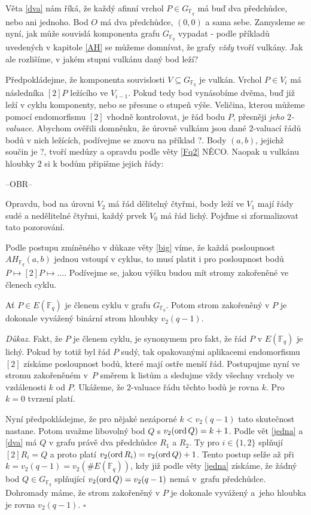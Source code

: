 \documentclass[12pt]{report}
\begin{document}
Věta \ref{dva} nám říká, že každý afinní vrchol $P \in G_{\mathbb{F}_q}$ má buď dva předchůdce, nebo ani jednoho. Bod $O$ má dva předchůdce, $(0,0)$ a sama sebe. Zamysleme se nyní, jak může souvislá komponenta grafu $G_{\mathbb{F}_q}$ vypadat - podle příkladů uvedených v kapitole \ref{AH} se můžeme domnívat, že grafy \textit{vždy} tvoří vulkány. Jak ale rozlišíme, v jakém stupni vulkánu daný bod leží?

Předpokládejme, že komponenta souvislosti $V \subseteq G_{\mathbb{F}_q}$ je vulkán.  Vrchol $P \in V_i$ má následníka $[2]P$ ležícího ve $V_{i-1}$. Pokud tedy bod vynásobíme dvěma, buď již leží v cyklu komponenty, nebo se přesune o stupeň výše. Veličina, kterou můžeme pomocí endomorfismu $[2]$ vhodně kontrolovat, je řád bodu $P$, přesněji \textit{jeho $2$-valuace}. Abychom ověřili domněnku, že úrovně vulkánu jsou dané $2$-valuací řádů bodů v nich ležících, podívejme se znovu na příklad ?. Body $(a,b)$, jejichž součin je ?, tvoří medúzy a opravdu podle věty \ref{Fq2} NĚCO. Naopak u vulkánu hloubky $2$ si k bodům připišme jejich řády:

--OBR--

Opravdu, bod na úrovni $V_2$ má řád dělitelný čtyřmi, body leží ve $V_1$ mají řády sudé a nedělitelné čtyřmi, každý prvek $V_0$ má řád lichý. Pojďme si zformalizovat tato pozorování.

Podle postupu zmíněného v důkaze věty \ref{big} víme, že každá posloupnost $AH_{\mathbb{F}_q}(a,b)$ jednou vstoupí v cyklus, to  musí platit i pro posloupnost bodů $P \longmapsto [2] P \longmapsto \dots$. Podívejme se, jakou výšku budou mít stromy zakořeněné ve členech cyklu.   

\begin{veta}
Ať $P \in E(\mathbb{F}_q)$ je členem cyklu v grafu $G_{\mathbb{F}_q}$. Potom strom zakořeněný v $P$ je dokonale vyvážený binární strom hloubky $v_2 (q-1)$. 
\end{veta}

\noindent \textit{Důkaz.} Fakt, že $P$ je členem cyklu, je synonymem pro fakt, že řád $P$ v $E(\mathbb{F}_q)$ je lichý. Pokud by totiž byl řád $P$ sudý, tak opakovanými aplikacemi endomorfismu $[2]$ získáme posloupnost bodů, které mají ostře menší řád. Postupujme nyní ve stromu zakořeněném v~$P$ směrem k listům a sledujme vždy všechny vrcholy ve vzdálenosti $k$ od $P$. Ukážeme, že $2$-valuace řádu těchto bodů je rovna $k$. Pro $k=0$ tvrzení platí.

Nyní předpokládejme, že pro nějaké nezáporné $k < v_2 (q-1)$ tato skutečnost nastane. Potom uvažme libovolný bod $Q$ s $v_2 (\operatorname{ord} Q) = k+1$. Podle vět \ref{jedna} a \ref{dva} má $Q$  v grafu právě dva předchůdce $R_1$ a $R_2$. Ty pro $i \in \lbrace 1,2 \rbrace$ splňují $[2] R_i = Q$ a proto platí $v_2 (\operatorname{ord} R_i) = v_2 (\operatorname{ord} Q) + 1$. Tento postup selže až při $k=v_2(q-1) = v_2 ( \# E (\mathbb{F}_q))$, kdy již podle věty \ref{jedna} získáme, že žádný bod $Q \in G_{\mathbb{F}_q}$ splňující $v_2 (\operatorname{ord} Q) = v_2 (q-1)$ nemá v~grafu předchůdce. 
Dohromady máme, že strom zakořeněný v $P$ je dokonale vyvážený a~jeho hloubka je rovna  $v_2(q-1)$. \hfill $\square$\\ 
\end{document}
